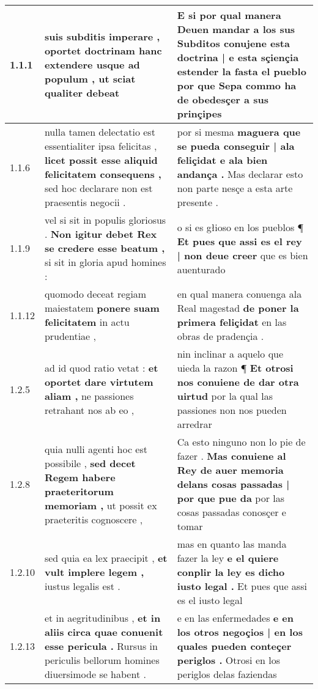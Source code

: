\begin{tabular}{|p{1cm}|p{6.5cm}|p{6.5cm}|}

\hline
1.1.1 & suis subditis imperare , \textbf{ oportet doctrinam hanc extendere usque ad populum , } ut sciat qualiter debeat & E si por qual manera Deuen mandar a los sus Subditos \textbf{ conujene esta doctrina | e esta sçiençia estender la fasta el pueblo } por que Sepa commo ha de obedesçer a sus prinçipes \\\hline
1.1.6 & nulla tamen delectatio est essentialiter ipsa felicitas , \textbf{ licet possit esse aliquid felicitatem consequens , } sed hoc declarare non est praesentis negocii . & por si mesma \textbf{ maguera que se pueda conseguir | ala feliçidat e ala bien andança . } Mas declarar esto non parte nesçe a esta arte presente . \\\hline
1.1.9 & vel si sit in populis gloriosus . \textbf{ Non igitur debet Rex se credere esse beatum , } si sit in gloria apud homines : & o si es głioso en los pueblos ¶ \textbf{ Et pues que assi es el rey | non deue creer } que es bien auenturado \\\hline
1.1.12 & quomodo deceat regiam maiestatem \textbf{ ponere suam felicitatem } in actu prudentiae , & en qual manera conuenga ala Real magestad \textbf{ de poner la primera feliçidat } en las obras de pradençia . \\\hline
1.2.5 & ad id quod ratio vetat : \textbf{ et oportet dare virtutem aliam , } ne passiones retrahant nos ab eo , & nin inclinar a aquelo que uieda la razon ¶ \textbf{ Et otrosi nos conuiene de dar otra uirtud } por la qual las passiones non nos pueden arredrar \\\hline
1.2.8 & quia nulli agenti hoc est possibile , \textbf{ sed decet Regem habere praeteritorum memoriam , } ut possit ex praeteritis cognoscere , & Ca esto ninguno non lo pie de fazer . \textbf{ Mas conuiene al Rey de auer memoria delans cosas passadas | por que pue da } por las cosas passadas conosçer e tomar \\\hline
1.2.10 & sed quia ea lex praecipit , \textbf{ et vult implere legem , } iustus legalis est . & mas en quanto las manda fazer la ley \textbf{ e el quiere conplir la ley es dicho iusto legal . } Et pues que assi es el iusto legal \\\hline
1.2.13 & et in aegritudinibus , \textbf{ et in aliis circa quae conuenit esse pericula . } Rursus in periculis bellorum homines diuersimode se habent . & e en las enfermedades \textbf{ e en los otros negoçios | en los quales pueden conteçer periglos . } Otrosi en los periglos delas faziendas \\\hline

\end{tabular}

